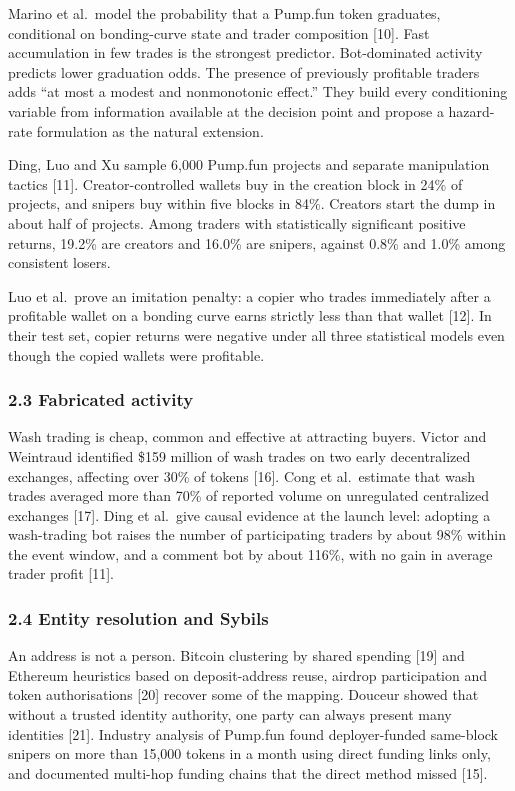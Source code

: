 Marino et al.~model the probability that a Pump.fun token graduates, conditional on bonding-curve state and trader composition {[}10{]}. Fast accumulation in few trades is the strongest predictor. Bot-dominated activity predicts lower graduation odds. The presence of previously profitable traders adds ``at most a modest and nonmonotonic effect.'' They build every conditioning variable from information available at the decision point and propose a hazard-rate formulation as the natural extension.

Ding, Luo and Xu sample 6,000 Pump.fun projects and separate manipulation tactics {[}11{]}. Creator-controlled wallets buy in the creation block in 24\% of projects, and snipers buy within five blocks in 84\%. Creators start the dump in about half of projects. Among traders with statistically significant positive returns, 19.2\% are creators and 16.0\% are snipers, against 0.8\% and 1.0\% among consistent losers.

Luo et al.~prove an imitation penalty: a copier who trades immediately after a profitable wallet on a bonding curve earns strictly less than that wallet {[}12{]}. In their test set, copier returns were negative under all three statistical models even though the copied wallets were profitable.

\subsubsection{2.3 Fabricated activity}\label{fabricated-activity}

Wash trading is cheap, common and effective at attracting buyers. Victor and Weintraud identified \$159 million of wash trades on two early decentralized exchanges, affecting over 30\% of tokens {[}16{]}. Cong et al.~estimate that wash trades averaged more than 70\% of reported volume on unregulated centralized exchanges {[}17{]}. Ding et al.~give causal evidence at the launch level: adopting a wash-trading bot raises the number of participating traders by about 98\% within the event window, and a comment bot by about 116\%, with no gain in average trader profit {[}11{]}.

\subsubsection{2.4 Entity resolution and Sybils}\label{entity-resolution-and-sybils}

An address is not a person. Bitcoin clustering by shared spending {[}19{]} and Ethereum heuristics based on deposit-address reuse, airdrop participation and token authorisations {[}20{]} recover some of the mapping. Douceur showed that without a trusted identity authority, one party can always present many identities {[}21{]}. Industry analysis of Pump.fun found deployer-funded same-block snipers on more than 15,000 tokens in a month using direct funding links only, and documented multi-hop funding chains that the direct method missed {[}15{]}.

